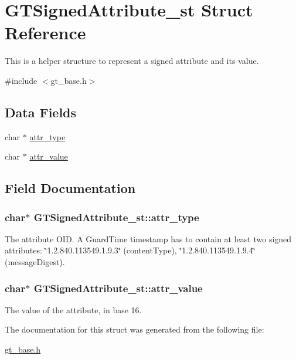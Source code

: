 \hypertarget{struct_g_t_signed_attribute__st}{
\section{GTSignedAttribute\_\-st Struct Reference}
\label{struct_g_t_signed_attribute__st}
}


This is a helper structure to represent a signed attribute and its value.  




{\ttfamily \#include $<$gt\_\-base.h$>$}

\subsection*{Data Fields}
\begin{DoxyCompactItemize}
\item 
char $\ast$ \hyperlink{struct_g_t_signed_attribute__st_ae7fefa23ec2f1a4d7d5d910174bb1f75}{attr\_\-type}
\item 
char $\ast$ \hyperlink{struct_g_t_signed_attribute__st_ac0dce87954c9af477d269ad229474884}{attr\_\-value}
\end{DoxyCompactItemize}


\subsection{Field Documentation}
\hypertarget{struct_g_t_signed_attribute__st_ae7fefa23ec2f1a4d7d5d910174bb1f75}{
\subsubsection[{attr\_\-type}]{\setlength{\rightskip}{0pt plus 5cm}char$\ast$ {\bf GTSignedAttribute\_\-st::attr\_\-type}}}
\label{struct_g_t_signed_attribute__st_ae7fefa23ec2f1a4d7d5d910174bb1f75}
The attribute OID. A GuardTime timestamp has to contain at least two signed attributes: \char`\"{}1.2.840.113549.1.9.3\char`\"{} (contentType), \char`\"{}1.2.840.113549.1.9.4\char`\"{} (messageDigest). \hypertarget{struct_g_t_signed_attribute__st_ac0dce87954c9af477d269ad229474884}{
\subsubsection[{attr\_\-value}]{\setlength{\rightskip}{0pt plus 5cm}char$\ast$ {\bf GTSignedAttribute\_\-st::attr\_\-value}}}
\label{struct_g_t_signed_attribute__st_ac0dce87954c9af477d269ad229474884}
The value of the attribute, in base 16. 

The documentation for this struct was generated from the following file:\begin{DoxyCompactItemize}
\item 
\hyperlink{gt__base_8h}{gt\_\-base.h}\end{DoxyCompactItemize}
